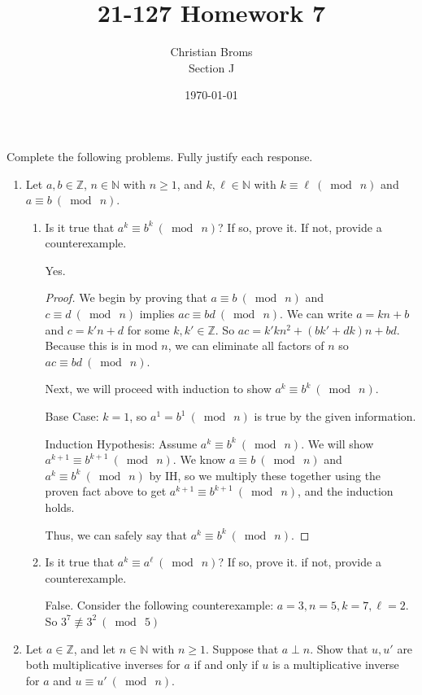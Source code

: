 \documentclass[12pt]{article}
\newcommand{\Z}{\mathbb{Z}}
\newcommand{\N}{\mathbb{N}}
\newcommand{\Mod}[1]{\ (\bmod\ #1)}
\begin{document}
\title{21-127 Homework 7}
\author{Christian Broms \\ Section J}
\date{\today}
\maketitle

Complete the following problems. Fully justify each response.
\begin{enumerate}

\item Let $a,b\in \Z$, $n\in \N$ with $n\geq 1$, and $k, \ell\in\N$ with $k\equiv \ell\Mod{n}$ and $a\equiv b\Mod{n}$.
\begin{enumerate}
\item Is it true that $a^k\equiv b^k\Mod{n}$? If so, prove it. If not, provide a counterexample.

Yes. 
\begin{proof}
We begin by proving that $a \equiv b \Mod{n}$ and $c \equiv d \Mod{n}$ implies $ac \equiv bd \Mod{n}$. We can write $a = kn + b$ and $c = k'n + d$ for some $k, k' \in \Z$. So $ac = k'kn^2 + (bk' + dk)n + bd$. Because this is in mod $n$, we can eliminate all factors of $n$ so $ac \equiv bd \Mod{n}$. 

Next, we will proceed with induction to show $a^k\equiv b^k\Mod{n}$. 

Base Case: $k = 1$, so $a^1 = b^1 \Mod{n}$ is true by the given information. 

Induction Hypothesis: Assume $a^k\equiv b^k\Mod{n}$. We will show $a^{k+1}\equiv b^{k+1}\Mod{n}$. We know $a\equiv b\Mod{n}$ and $a^k\equiv b^k\Mod{n}$ by IH, so we multiply these together using the proven fact above to get $a^{k+1}\equiv b^{k+1}\Mod{n}$, and the induction holds. 

Thus, we can safely say that $a^k\equiv b^k\Mod{n}$. 
\end{proof}

\item Is it true that $a^k\equiv a^\ell\Mod{n}$? If so, prove it. if not, provide a counterexample.

False. Consider the following counterexample: $a = 3, n = 5, k = 7, \ell =2 $. So $3^7 \not\equiv 3^2 \Mod{5}$
\end{enumerate}

\item Let $a\in\Z$, and let $n\in\N$ with $n\geq 1$. Suppose that $a\perp n$. Show that $u, u'$ are both multiplicative inverses for $a$ if and only if $u$ is a multiplicative inverse for $a$ and $u\equiv u'\Mod{n}$.


\end{enumerate}
\end{document}
